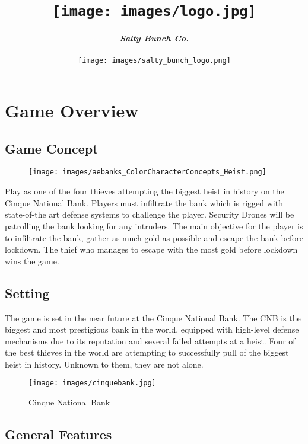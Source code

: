 \documentclass[10pt]{report}
\title{\texttt{[image: images/logo.jpg]}}
\author{\textbf{\textit{Salty Bunch Co.}}\\\\\texttt{[image: images/salty\_bunch\_logo.png]}}
\date{}
\begin{document}
\maketitle
\tableofcontents

\chapter{Game Overview}

\section{Game Concept}

\begin{figure}[H]
    \texttt{[image: images/aebanks\_ColorCharacterConcepts\_Heist.png]}
    \caption{}
\end{figure}

Play as one of the four thieves attempting the biggest heist in history on the Cinque National Bank. Players must infiltrate the bank which is rigged with state-of-the art defense systems to challenge the player. Security Drones will be patrolling the bank looking for any intruders.
The main objective for the player is to infiltrate the bank, gather as much gold as possible and escape the bank before lockdown. The thief who manages to escape with the most gold before lockdown wins the game.


\section{Setting}

The game is set in the near future at the Cinque National Bank. The CNB is the biggest and most prestigious bank in the world, equipped with high-level defense mechanisms due to its reputation and several failed attempts at a heist. Four of the best thieves in the world are attempting to successfully pull of the biggest heist in history. Unknown to them, they are not alone.

\begin{figure}[H]
    \centering
    \texttt{[image: images/cinquebank.jpg]}
    \caption{Cinque National Bank}
\end{figure}

\section{General Features}
\end{document}

